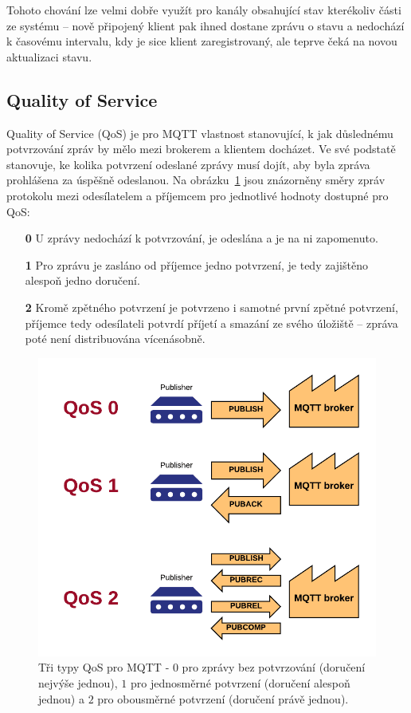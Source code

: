 Tohoto chování lze velmi dobře využít pro kanály obsahující stav kterékoliv části ze systému --
nově připojený klient pak ihned dostane zprávu o stavu a nedochází k časovému intervalu, kdy je sice klient
zaregistrovaný, ale teprve čeká na novou aktualizaci stavu.

\subsection{Quality of Service}\label{subsec:quality-of-service}
Quality of Service (QoS) je pro MQTT vlastnost stanovující, k jak důslednému potvrzování zpráv by mělo mezi
brokerem a klientem docházet.
Ve své podstatě stanovuje, ke kolika potvrzení odeslané zprávy musí dojít, aby byla
zpráva prohlášena za úspěšně odeslanou.
Na obrázku~\ref{fig:mqtt-qos} jsou znázorněny směry zpráv protokolu mezi odesílatelem a příjemcem pro jednotlivé
hodnoty dostupné pro QoS:

\begin{enumerate}
    \item[\textbf{0}] U zprávy nedochází k potvrzování, je odeslána a je na ni zapomenuto.
    \item[\textbf{1}] Pro zprávu je zasláno od příjemce jedno potvrzení, je tedy zajištěno alespoň jedno doručení.
    \item[\textbf{2}] Kromě zpětného potvrzení je potvrzeno i samotné první zpětné potvrzení, příjemce tedy
    odesílateli potvrdí příjetí a smazání ze svého úložiště -- zpráva poté není distribuována vícenásobně.
\end{enumerate}

\begin{figure}
    \centering
    \includegraphics[width=.5\textwidth]{figures/mqtt-qos.png}
    \caption{Tři typy QoS pro MQTT - $0$ pro zprávy bez potvrzování (doručení nejvýše jednou), $1$ pro jednosměrné
    potvrzení (doručení alespoň jednou) a $2$ pro obousměrné potvrzení (doručení právě jednou).}
    \label{fig:mqtt-qos}
\end{figure}

